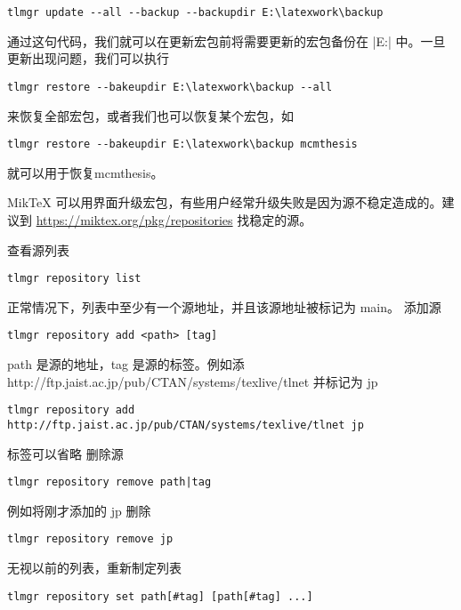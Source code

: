 \begin{verbatim}
tlmgr update --all --backup --backupdir E:\latexwork\backup
\end{verbatim}

通过这句代码，我们就可以在更新宏包前将需要更新的宏包备份在
|E:\latexwork\backup| 中。一旦更新出现问题，我们可以执行

\begin{verbatim}
tlmgr restore --bakeupdir E:\latexwork\backup --all
\end{verbatim}

来恢复全部宏包，或者我们也可以恢复某个宏包，如

\begin{verbatim}
tlmgr restore --bakeupdir E:\latexwork\backup mcmthesis
\end{verbatim}

就可以用于恢复mcmthesis。



MikTeX
可以用界面升级宏包，有些用户经常升级失败是因为源不稳定造成的。建议到
\url{https://miktex.org/pkg/repositories} 找稳定的源。



查看源列表
\begin{verbatim}
tlmgr repository list
\end{verbatim}

正常情况下，列表中至少有一个源地址，并且该源地址被标记为 main。 添加源
\begin{verbatim}
tlmgr repository add <path> [tag]
\end{verbatim}

path 是源的地址，tag 是源的标签。例如添
http://ftp.jaist.ac.jp/pub/CTAN/systems/texlive/tlnet 并标记为 jp
\begin{verbatim}
tlmgr repository add http://ftp.jaist.ac.jp/pub/CTAN/systems/texlive/tlnet jp
\end{verbatim}

标签可以省略 删除源
\begin{verbatim}
tlmgr repository remove path|tag
\end{verbatim}

例如将刚才添加的 jp 删除
\begin{verbatim}
tlmgr repository remove jp
\end{verbatim}

无视以前的列表，重新制定列表
\begin{verbatim}
tlmgr repository set path[#tag] [path[#tag] ...]
\end{verbatim}

